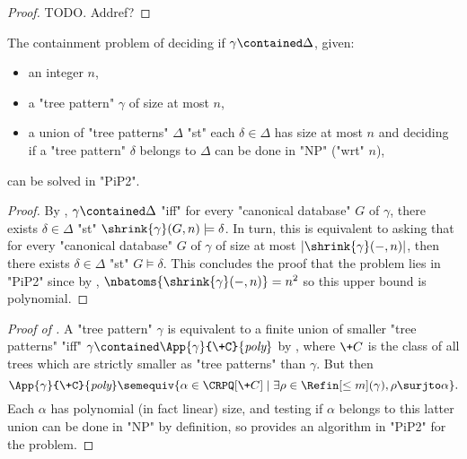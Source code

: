 \begin{proof}
  TODO. Addref?
\end{proof}

\begin{corollary}
  \AP\label{coro:containment-union-tree-patterns-better}
  The containment problem of deciding if $\gamma \contained \Delta$, given:
  \begin{itemize}
    \item an integer $n$,
    \item a "tree pattern" $\gamma$ of size at most $n$,
    \item a union of "tree patterns" $\Delta$ "st" each $\delta \in \Delta$ has size at most $n$
    and deciding if a "tree pattern" $\delta$ belongs to $\Delta$ can be done in "NP" ("wrt" $n$),
  \end{itemize} 
  can be solved in "PiP2".
\end{corollary}

\begin{proof}
  By ,
  $\gamma \contained \Delta$ "iff" for every "canonical database" $G$ of $\gamma$,
  there exists $\delta \in \Delta$ "st"
  $\shrink{\gamma}(G, n) \models \delta$.
  In turn, this is equivalent to asking that for every "canonical database" $G$ of $\gamma$
  of size at most $|\shrink{\gamma}(-, n)|$, then there exists $\delta\in \Delta$
  "st" $G \models \delta$.
  This concludes the proof that the problem lies in "PiP2" since by , $\nbatoms{\shrink{\gamma}(-, n)} = n^2$ so this
  upper bound is polynomial.
\end{proof}

\begin{proof}[Proof of ]
  A "tree pattern" $\gamma$ is equivalent to a finite union of smaller "tree patterns"
  "iff" $\gamma \contained \App{\gamma}{\+C}{\textit{poly}}$ by ,
  where $\+C$ is the class of all trees which are strictly smaller as "tree patterns"
  than $\gamma$.
  But then 
  \[
    \App{\gamma}{\+C}{\textit{poly}} \semequiv 
    \{
      \alpha \in \CRPQ[\+C] \mid \exists \rho \in \Refin[\leq m](\gamma), 
      \rho \surjto \alpha
    \}.
  \]
  Each $\alpha$ has polynomial (in fact linear) size,
  and testing if $\alpha$ belongs to this latter union can be done in "NP" by definition,
  so  provides an algorithm in "PiP2"
  for the problem.

   
\end{proof}

